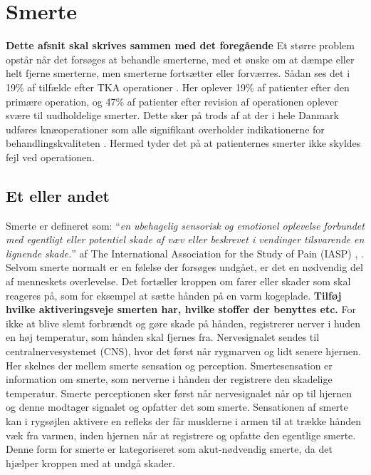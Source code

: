 \section{Smerte}
\textbf{Dette afsnit skal skrives sammen med det foregående}
Et større problem opstår når det forsøges at behandle smerterne, med et ønske om at dæmpe eller helt fjerne smerterne, men smerterne fortsætter eller forværres. Sådan ses det i 19\% af tilfælde efter TKA operationer \citep{Petersen2015}. Her oplever 19\% af patienter efter den primære operation, og 47\% af patienter efter revision af operationen oplever svære til uudholdelige smerter. Dette sker på trods af at der i hele Danmark udføres knæoperationer som alle signifikant overholder indikationerne for behandlingskvaliteten \citep{aarsrapport2016}. Hermed tyder det på at patienternes smerter ikke skyldes fejl ved operationen.


\subsection{Et eller andet}

Smerte er defineret som: “\textit{en ubehagelig sensorisk og emotionel oplevelse forbundet med egentligt eller potentiel skade af væv eller beskrevet i vendinger tilsvarende en lignende skade.}” af The International Association for the Study of Pain (IASP) \citep{Giangregorio1997}, \citep{Carmon}.\\
Selvom smerte normalt er en følelse der forsøges undgået, er det en nødvendig del af menneskets overlevelse. Det fortæller kroppen om farer eller skader som skal reageres på, som for eksempel at sætte hånden på en varm kogeplade. \textbf{Tilføj hvilke aktiveringsveje smerten har, hvilke stoffer der benyttes etc.} For ikke at blive slemt forbrændt og gøre skade på hånden, registrerer nerver i huden en høj temperatur, som hånden skal fjernes fra. Nervesignalet sendes til centralnervesystemet (CNS), hvor det først når rygmarven og lidt senere hjernen. Her skelnes der mellem smerte sensation og perception. Smertesensation er information om smerte, som nerverne i hånden der registrere den skadelige temperatur. Smerte perceptionen sker først når nervesignalet når op til hjernen og denne modtager signalet og opfatter det som smerte. Sensationen af smerte kan i rygsøjlen aktivere en refleks der får musklerne i armen til at trække hånden væk fra varmen, inden hjernen når at registrere og opfatte den egentlige smerte. \citep{Martini} Denne form for smerte er kategoriseret som akut-nødvendig smerte, da det hjælper kroppen med at undgå skader.

